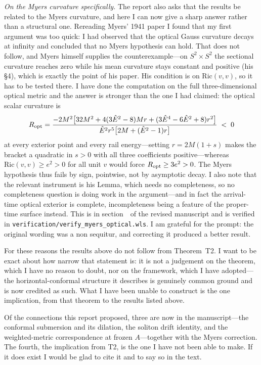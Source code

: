\documentclass[11pt]{article}
\begin{document}
\emph{On the Myers curvature specifically.} The report also asks that the results
be related to the Myers curvature, and here I can now give a sharp answer rather
than a structural one. Rereading Myers' 1941 paper I found that my first argument
was too quick: I had observed that the optical Gauss curvature decays at infinity
and concluded that no Myers hypothesis can hold. That does not follow, and Myers
himself supplies the counterexample---on $S^2\times S^2$ the sectional curvature
reaches zero while his mean curvature stays constant and positive (his \S4), which
is exactly the point of his paper. His condition is on $\mathrm{Ric}(v,v)$, so it
has to be tested there. I have done the computation on the full three-dimensional
optical metric and the answer is stronger than the one I had claimed: the optical
scalar curvature is
\[
   R_{\rm opt}=\frac{-2M^2\big[32M^2+4(3\hat E^2-8)Mr
     +(3\hat E^4-6\hat E^2+8)r^2\big]}{\hat E^2r^5\big[2M+(\hat E^2-1)r\big]}
   \;<\;0
\]
at every exterior point and every rail energy---setting $r=2M(1+s)$ makes the
bracket a quadratic in $s>0$ with all three coefficients positive---whereas
$\mathrm{Ric}(v,v)\ge e^2>0$ for all unit $v$ would force $R_{\rm opt}\ge3e^2>0$.
The Myers hypothesis thus fails by sign, pointwise, not by asymptotic decay. I also
note that the relevant instrument is his Lemma, which needs no completeness, so no
completeness question is doing work in the argument---and in fact the arrival-time
optical exterior is complete, incompleteness being a feature of the proper-time
surface instead. This
is in section~\msSecSubmersion\ of the revised manuscript and is verified in
\texttt{verification/verify\_myers\_optical.wls}. I am grateful for the prompt: the
original wording was a non sequitur, and correcting it produced a better result.

For these reasons the results above do not follow from Theorem~T2. I want to be
exact about how narrow that statement is: it is not a judgement on the theorem,
which I have no reason to doubt, nor on the framework, which I have adopted---the
horizontal-conformal structure it describes is genuinely common ground and is now
credited as such. What I have been unable to construct is the one implication, from
that theorem to the results listed above.

Of the connections this report proposed, three are now in the manuscript---the
conformal submersion and its dilation, the soliton drift identity, and the
weighted-metric correspondence at frozen $A$---together with the Myers correction.
The fourth, the implication from T2, is the one I have not been able to make. If it
does exist I would be glad to cite it and to say so in the text.
\end{document}
